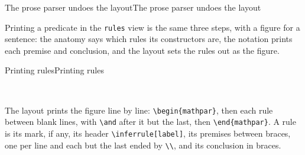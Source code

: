 \documentclass[acmsmall,screen,review,anonymous,nonacm]{acmart}
\begin{document}
\begin{leantheorem}[sum=9XeApCtqKz]{The prose parser undoes the layout}{The prose parser undoes the layout}
\label{thm:The-prose-parser-undoes-the-layout}
\end{leantheorem}

Printing a predicate in the \texttt{rules} view is the same three steps,
with a figure for a sentence: the anatomy says which rules its
constructors are, the notation prints each premise and conclusion, and the
layout sets the rules out as the figure.

\begin{leandef}[sum=kUNzlKsN1c, dflt=Q-8Y76pGB2]{Printing rules}{Printing rules}
\begin{LeanDisplay}
\\
\end{LeanDisplay}
\end{leandef}

The layout prints the figure line by line:
\texttt{\textbackslash{}begin\{mathpar\}}, then each rule between blank
lines, with \texttt{\textbackslash{}and} after it but the last, then
\texttt{\textbackslash{}end\{mathpar\}}. A rule is its mark, if any, its
header \texttt{\textbackslash{}inferrule[label]}, its premises between
braces, one per line and each but the last ended by
\texttt{\textbackslash{}\textbackslash{}}, and its conclusion in braces.
\end{document}
